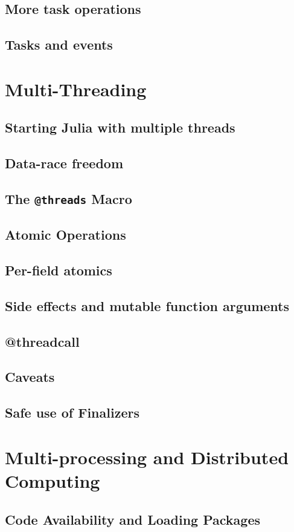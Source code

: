     \section{More task operations}
    \section{Tasks and events}
  \chapter{Multi-Threading}
    \section{Starting Julia with multiple threads}
    \section{Data-race freedom}
    \section{The \texttt{@threads} Macro}
    \section{Atomic Operations}
    \section{Per-field atomics}
    \section{Side effects and mutable function arguments}
    \section{@threadcall}
    \section{Caveats}
    \section{Safe use of Finalizers}
  \chapter{Multi-processing and Distributed Computing}
    \section{Code Availability and Loading Packages}
